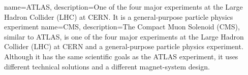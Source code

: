 


{
        name=ATLAS,
        description={One of the four major experiments at the Large Hadron Collider (LHC) at CERN. It is a general-purpose particle physics experiment\cite{AboutATLAS} }
}
{
        name=CMS,
        description={The Compact Muon Solenoid (CMS), similar to ATLAS, is one of the four major experiments at the Large Hadron Collider (LHC) at CERN and a general-purpose particle physics experiment. Although it has the same scientific goals as the ATLAS experiment, it uses different technical solutions and a different magnet-system design. \cite{AboutCMS} }
}
